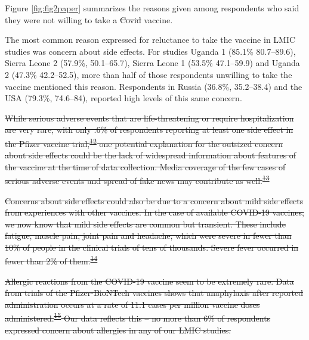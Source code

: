 \documentclass[
  12pt,
]{article}
\providecommand{\DIFaddtex}[1]{{\protect\color{blue}\uwave{#1}}} %
\providecommand{\DIFdeltex}[1]{{\protect\color{red}\sout{#1}}}                      %
\providecommand{\DIFaddbegin}{} %
\providecommand{\DIFaddend}{} %
\providecommand{\DIFdelbegin}{} %
\providecommand{\DIFdelend}{} %
\providecommand{\DIFadd}[1]{\texorpdfstring{\DIFaddtex{#1}}{#1}} %
\providecommand{\DIFdel}[1]{\texorpdfstring{\DIFdeltex{#1}}{}} %
\newcommand{\DIFscaledelfig}{0.5}
\newlength{\DIFdelgraphicswidth} %
\newlength{\DIFdelgraphicsheight} %
\newcommand{\DIFaddincludegraphics}[2][]{{\color{blue}\fbox{\DIFOincludegraphics[#1]{#2}}}} %
\newcommand{\DIFdelincludegraphics}[2][]{%
\sbox{\DIFdelgraphicsbox}{\DIFOincludegraphics[#1]{#2}}%
\settoboxwidth{\DIFdelgraphicswidth}{\DIFdelgraphicsbox} %
\settoboxtotalheight{\DIFdelgraphicsheight}{\DIFdelgraphicsbox} %
\scalebox{\DIFscaledelfig}{%
\parbox[b]{\DIFdelgraphicswidth}{\usebox{\DIFdelgraphicsbox}\\[-\baselineskip] \rule{\DIFdelgraphicswidth}{0em}}\llap{\resizebox{\DIFdelgraphicswidth}{\DIFdelgraphicsheight}{%
\setlength{\unitlength}{\DIFdelgraphicswidth}%
\begin{picture}(1,1)%
\thicklines\linethickness{2pt} %
{\color[rgb]{1,0,0}\put(0,0){\framebox(1,1){}}}%
{\color[rgb]{1,0,0}\put(0,0){\line( 1,1){1}}}%
{\color[rgb]{1,0,0}\put(0,1){\line(1,-1){1}}}%
\end{picture}%
}\hspace*{3pt}}} %
} %
\DeclareRobustCommand{\DIFaddbegin}{\DIFOaddbegin \let\includegraphics\DIFaddincludegraphics} %
\DeclareRobustCommand{\DIFaddend}{\DIFOaddend \let\includegraphics\DIFOincludegraphics} %
\DeclareRobustCommand{\DIFdelbegin}{\DIFOdelbegin \let\includegraphics\DIFdelincludegraphics} %
\DeclareRobustCommand{\DIFdelend}{\DIFOaddend \let\includegraphics\DIFOincludegraphics} %
\begin{document}
\DIFdelend Figure \ref{fig:fig2paper} summarizes the reasons given among respondents who said they were not willing to take a \DIFdelbegin \DIFdel{Covid }\DIFdelend \DIFaddbegin \DIFadd{COVID-19 }\DIFaddend vaccine.

The most common reason expressed for reluctance to take the vaccine in LMIC studies was concern about side effects. For studies Uganda 1 (85.1\% 80.7--89.6), Sierra Leone 2 (57.9\%, 50.1--65.7), Sierra Leone 1 (53.5\% 47.1--59.9) and Uganda 2 (47.3\% 42.2--52.5), more than half of those respondents unwilling to take the vaccine mentioned this reason. Respondents in Russia (36.8\%, 35.2--38.4) and the USA (79.3\%, 74.6--84), reported high levels of this same concern.

\DIFdelbegin \DIFdel{While serious adverse events that are life-threatening or require hospitalization are very rare, with only .6\% of respondents reporting at least one side effect in the Pfizer vaccine trial,\textsuperscript{\protect\hyperlink{ref-cdcadverse}{12}} one potential explanation for the outsized concern about side effects could be the lack of widespread information about features of the vaccine at the time of data collection. Media coverage of the few cases of serious adverse events and spread of fake news may contribute as well.\textsuperscript{\protect\hyperlink{ref-stein2017golden}{13}}
}%

\DIFdel{Concerns about side effects could also be due to a concern about mild side effects from experiences with other vaccines. In the case of available COVID-19 vaccines, we now know that mild side effects are common but transient. These include fatigue, muscle pain, joint pain and headache, which were severe in fewer than 10\% of people in the clinical trials of tens of thousands. Severe fever occurred in fewer than 2\% of them.\textsuperscript{\protect\hyperlink{ref-wadman2020public}{14}}
}%

\DIFdel{Allergic reactions from the COVID-19 vaccine seem to be extremely rare. Data from trials of the Pfizer-BioNTech vaccines shows that anaphylaxis after reported administration occurs at a rate of 11.1 cases per million vaccine doses administered.\textsuperscript{\protect\hyperlink{ref-cdcallergies}{15}} Our data reflects this -- no more than 6\% of respondents expressed concern about allergies in any of our LMIC studies.
}%
\end{document}
